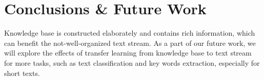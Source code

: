 \documentclass{article}
\begin{document}
\section{Conclusions \& Future Work}
Knowledge base is constructed elaborately and contains rich information, which can benefit the not-well-organized text stream. As a part of our future work, we will explore the effects of transfer learning from knowledge base to text stream for more tasks, such as text classification and key words extraction, especially for short texts. 

\newpage

\small

\end{document}
